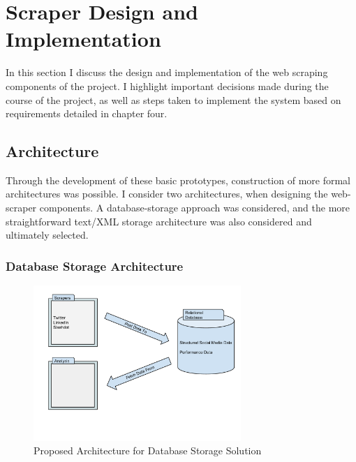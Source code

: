 \chapter{Scraper Design and Implementation}\label{C:us}

In this section I discuss the design and implementation of the web scraping components of the project. I highlight important decisions made during the course of the project, as well as steps taken to implement the system based on requirements detailed in chapter four.






\section{Architecture}

Through the development of these basic prototypes, construction of more formal architectures was possible. I consider two architectures, when designing the web-scraper components. A database-storage approach was considered, and the more straightforward text/XML storage architecture was also considered and ultimately selected. 

\subsection{Database Storage Architecture}

\begin{figure}[h!]
 \centering
 \includegraphics[width=0.7\textwidth]{Images/Database_Architecture.pdf}
 \caption{Proposed Architecture for Database Storage Solution}
\end{figure}

